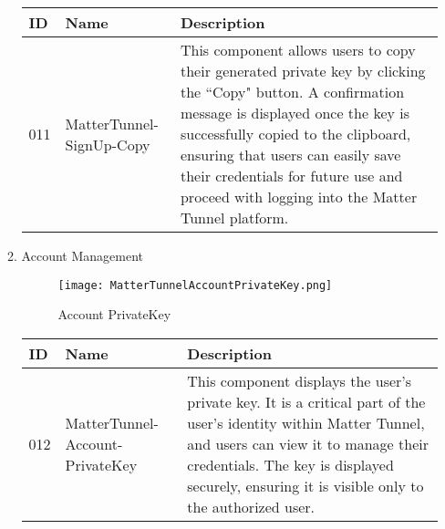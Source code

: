 \documentclass[conference]{IEEEtran}
\begin{document}
\begin{enumerate}[itemsep=2ex, parsep=1ex]
\begin{enumerate}[itemsep=2ex, parsep=1ex]
	      	      \begin{table}[h!]
	      	      	\def\arraystretch{1.24} \small
	      	      	\begin{tabular}{|p{1.2cm}|p{2.5cm}|p{4.0cm}|}
	      	      		\hline
	      	      		ID  & Name                     & Description                                                                                                                                                                                                                                                                                                              \\
	      	      		\hline
	      	      		011 & MatterTunnel-SignUp-Copy & This component allows users to copy their generated private key by clicking the ``Copy" button. A confirmation message is displayed once the key is successfully copied to the clipboard, ensuring that users can easily save their credentials for future use and proceed with logging into the Matter Tunnel platform. \\
	      	      		\hline
	      	      	\end{tabular}
	      	      \end{table}
	      	      	      	      
	      	      \clearpage
	      	      	      	      
	      	\item Account Management
	      	                  
	      	      \begin{figure}[h!]
	      	      	\centering
	      	      	\texttt{[image: MatterTunnelAccountPrivateKey.png]}
	      	      	\caption{Account PrivateKey}
	      	      	\label{fig:MatterTunnelAccountPrivateKey}
	      	      \end{figure}
	      	                  
	      	      \begin{table}[h!]
	      	      	\def\arraystretch{1.24} \small
	      	      	\begin{tabular}{|p{1.2cm}|p{2.5cm}|p{4.0cm}|}
	      	      		\hline
	      	      		ID  & Name                            & Description                                                                                                                                                                                                                                              \\
	      	      		\hline
	      	      		012 & MatterTunnel-Account-PrivateKey & This component displays the user's private key. It is a critical part of the user's identity within Matter Tunnel, and users can view it to manage their credentials. The key is displayed securely, ensuring it is visible only to the authorized user. \\
	      	      		\hline
	      	      	\end{tabular}
	      	      \end{table}


\end{enumerate}
\end{enumerate}
\end{document}
